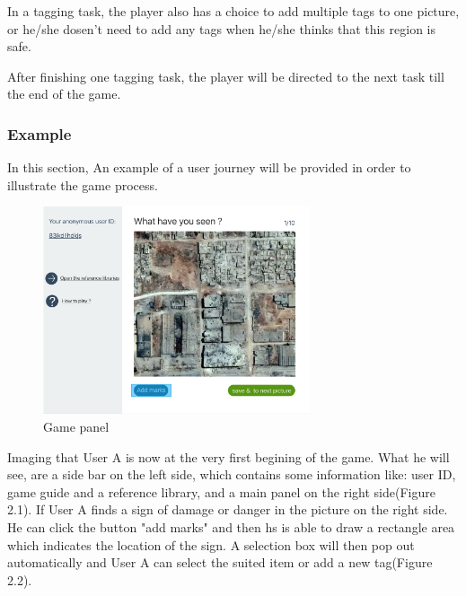       In a tagging task,
      the player also has a choice to add multiple tags to one picture,
      or he/she dosen't need to add any tags when he/she thinks that this region is safe.

      After finishing one tagging task, 
      the player will be directed to the next task till the end of the game.


      \subsubsection{Example}
      In this section,
      An example of a user journey will be provided in order to illustrate the game process.

      \begin{figure}[htp]
      \centering
      \includegraphics[width=0.7\textwidth]{figures/function-player-0}
      \caption{Game panel}
      \label{fig:main-panel}
      \end{figure}

      Imaging that User A is now at the very first begining of the game.
      What he will see,
      are a side bar on the left side,
      which contains some information like:
      user ID,
      game guide and a reference library,
      and a main panel on the right side(Figure 2.1).
      If User A finds a sign of damage or danger in the picture on the right side.
      He can click the button "add marks" and then hs is able to draw a rectangle area which indicates the location of the sign.
      A selection box will then pop out automatically and User A can select the suited item or add a new tag(Figure 2.2).

